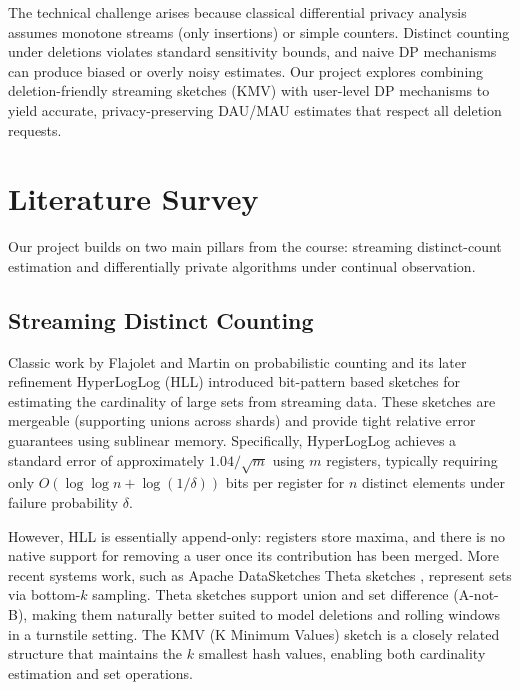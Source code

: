 \documentclass[11pt]{article}
\begin{document}
The technical challenge arises because classical differential privacy analysis assumes monotone streams (only insertions) or simple counters. Distinct counting under deletions violates standard sensitivity bounds, and naive DP mechanisms can produce biased or overly noisy estimates. Our project explores combining deletion-friendly streaming sketches (KMV) with user-level DP mechanisms to yield accurate, privacy-preserving DAU/MAU estimates that respect all deletion requests.

\newpage
\section{Literature Survey}

Our project builds on two main pillars from the course: streaming distinct-count estimation and differentially private algorithms under continual observation.

\subsection{Streaming Distinct Counting}

Classic work by Flajolet and Martin on probabilistic counting \cite{flajolet1985probabilistic} and its later refinement HyperLogLog (HLL) \cite{flajolet2007hyperloglog} introduced bit-pattern based sketches for estimating the cardinality of large sets from streaming data. These sketches are mergeable (supporting unions across shards) and provide tight relative error guarantees using sublinear memory. Specifically, HyperLogLog achieves a standard error of approximately $1.04/\sqrt{m}$ using $m$ registers, typically requiring only $O(\log \log n + \log(1/\delta))$ bits per register for $n$ distinct elements under failure probability $\delta$.

However, HLL is essentially append-only: registers store maxima, and there is no native support for removing a user once its contribution has been merged. More recent systems work, such as Apache DataSketches Theta sketches \cite{datasketches2024theta}, represent sets via bottom-$k$ sampling. Theta sketches support union and set difference (A-not-B), making them naturally better suited to model deletions and rolling windows in a turnstile setting. The KMV (K Minimum Values) sketch is a closely related structure that maintains the $k$ smallest hash values, enabling both cardinality estimation and set operations.
\end{document}
